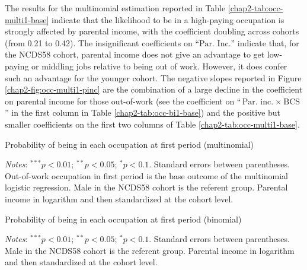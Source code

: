 The results for the multinomial estimation reported in Table \ref{chap2-tab:occ-multi1-base} indicate that the likelihood to be in a high-paying occupation is strongly affected by parental income, with the coefficient doubling across cohorts (from 0.21 to 0.42). The insignificant coefficients on ``$\text{Par. Inc.}$'' indicate that, for the NCDS58 cohort, parental income does not give an advantage to get low-paying or middling jobs relative to being out of work. However, it does confer such an advantage for the younger cohort. The negative slopes reported in Figure \ref{chap2-fig:occ-multi1-pinc} are the combination of a large decline in the coefficient on parental income for those out-of-work (see the coefficient on ``$\text{Par. inc.}~\times~\text{BCS}$'' in the first column in Table \ref{chap2-tab:occ-bi1-base}) and the positive but smaller coefficients on the first two columns of Table \ref{chap2-tab:occ-multi1-base}.

\begin{table}[!htb]
    \centering
    \caption{Probability of being in each occupation at first period (multinomial)}
    \label{chap2-tab:occ-multi1-base}
    \begin{threeparttable}
        \centering
        \setlength{\tabcolsep}{15pt}
        
        \begin{tablenotes}[flushleft]
            \footnotesize{\item \textit{Notes}: 
            $^{***}p<0.01$; $^{**}p<0.05$; $^{*}p<0.1$. Standard errors between parentheses. 
            Out-of-work occupation in first period is the base outcome of the multinomial logistic regression.
            Male in the NCDS58 cohort is the referent group. 
            Parental income in logarithm and then standardized at the cohort level.}
        \end{tablenotes}
    \end{threeparttable}
\end{table}

\begin{table}[!htb]
    \centering
    \caption{Probability of being in each occupation at first period (binomial)}
    \label{chap2-tab:occ-bi1-base}
    \begin{threeparttable}
        \centering
        
        \begin{tablenotes}[flushleft]
            \footnotesize{\item \textit{Notes}: 
            $^{***}p<0.01$; $^{**}p<0.05$; $^{*}p<0.1$. Standard errors between parentheses. 
            Male in the NCDS58 cohort is the referent group. 
            Parental income in logarithm and then standardized at the cohort level.}
        \end{tablenotes}
    \end{threeparttable}
\end{table}

